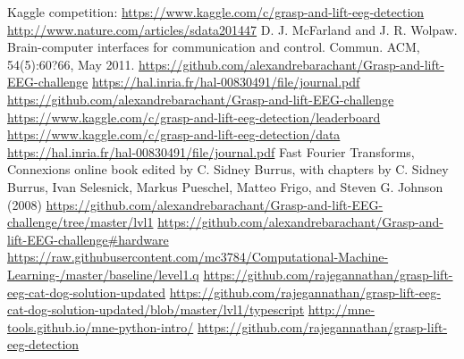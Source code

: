 \documentclass[]{article}
\begin{document}
\begin{thebibliography}{1}
   Kaggle competition:  \url{https://www.kaggle.com/c/grasp-and-lift-eeg-detection}
   \url{http://www.nature.com/articles/sdata201447}
  D. J. McFarland and J. R. Wolpaw. Brain-computer interfaces for communication and control. Commun. ACM, 54(5):60?66, May 2011.
  \url{https://github.com/alexandrebarachant/Grasp-and-lift-EEG-challenge}
  \url{https://hal.inria.fr/hal-00830491/file/journal.pdf}
  \url{https://github.com/alexandrebarachant/Grasp-and-lift-EEG-challenge}
  \url{https://www.kaggle.com/c/grasp-and-lift-eeg-detection/leaderboard}
  \url{https://www.kaggle.com/c/grasp-and-lift-eeg-detection/data}
  \url{https://hal.inria.fr/hal-00830491/file/journal.pdf}
  Fast Fourier Transforms, Connexions online book edited by C. Sidney Burrus, with chapters by C. Sidney Burrus, Ivan Selesnick, Markus Pueschel, Matteo Frigo, and Steven G. Johnson (2008)
   \url{https://github.com/alexandrebarachant/Grasp-and-lift-EEG-challenge/tree/master/lvl1}
   \url{https://github.com/alexandrebarachant/Grasp-and-lift-EEG-challenge\#hardware}
   \url{https://raw.githubusercontent.com/mc3784/Computational-Machine-Learning-/master/baseline/level1.q}
   \url{https://github.com/rajegannathan/grasp-lift-eeg-cat-dog-solution-updated}
   \url{https://github.com/rajegannathan/grasp-lift-eeg-cat-dog-solution-updated/blob/master/lvl1/typescript}
  \url{http://mne-tools.github.io/mne-python-intro/}
  \url{https://github.com/rajegannathan/grasp-lift-eeg-detection}
\end{thebibliography} 
\end{document}
